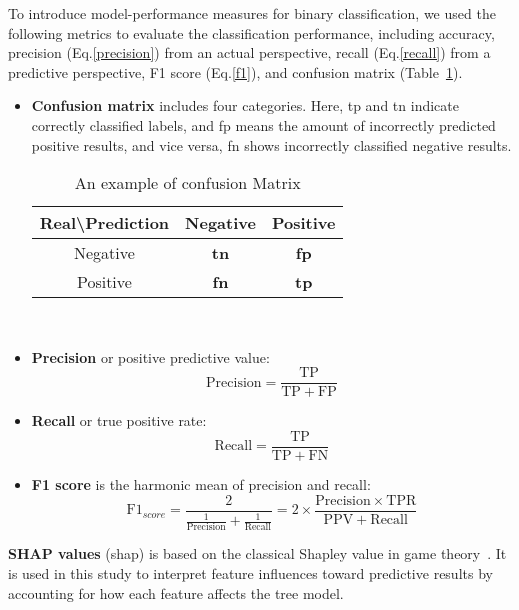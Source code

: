 \documentclass[twoside,twocolumn,9pt]{article}
\begin{document}
To introduce model-performance measures for binary classification, we used the following metrics to evaluate the classification performance, including accuracy, precision (Eq.\ref{precision}) from an actual perspective, recall (Eq.\ref{recall}) from a predictive perspective, F1 score (Eq.\ref{f1}), and confusion matrix (Table~\ref{cm}). 
\begin{itemize}
\item \textbf{Confusion matrix} includes four categories. Here, \acrfull*{tp} and \acrfull*{tn} indicate correctly classified labels, and \acrfull*{fp} means the amount of incorrectly predicted positive results, and vice versa, \acrfull*{fn} shows incorrectly classified negative results.
\begin{table}[!htb]
\centering
\caption{An example of confusion Matrix}
\begin{tabular}{c|c|c} 
\hline
Real\textbackslash{}Prediction & Negative & Positive \\ \hline
Negative & \textbf{\acrshort*{tn}} & \textbf{\acrshort*{fp}} \\\hline
Positive & \textbf{\acrshort*{fn}} & \textbf{\acrshort*{tp}} \\\hline
\end{tabular}\
\label{cm}
\end{table}

\item \textbf{Precision} or positive predictive value:
\begin{equation}
\textrm{Precision} =\frac{\mathrm{TP}}{\mathrm{TP}+\mathrm{FP}}
\label{precision}
\end{equation}
\item \textbf{Recall} or true positive rate:
\begin{equation}
\textrm{Recall} =\frac{\mathrm{TP}}{\mathrm{TP}+\mathrm{FN}}
\label{recall}
\end{equation}

\item \textbf{F1 score} is the harmonic mean of precision and recall:
\begin{equation}\label{f1}
\mathrm{F1}_{score} = \frac{2}{\frac{1}{\textrm{Precision}}+\frac{1}{\textrm{Recall}}}
= 2 \times \frac{\mathrm{\textrm{Precision}} \times \mathrm{TPR}}{\mathrm{PPV}+\mathrm{\textrm{Recall}}}
\end{equation}
\end{itemize}
\textbf{SHAP values} (\acrshort*{shap}) is based on the classical Shapley value in game theory~\cite{kuhn1953contributions, lundberg2020local2global}. It is used in this study to interpret feature influences toward predictive results by accounting for how each feature affects the tree model. 
\end{document}

